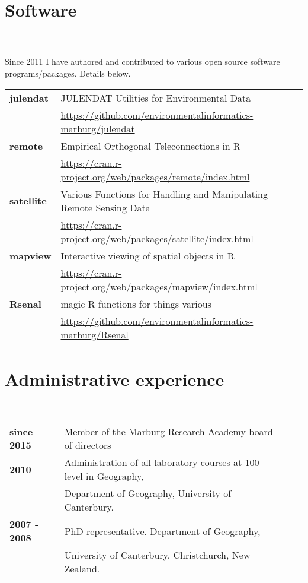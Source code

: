 \documentclass[a4paper,11pt]{article}
\begin{document}
\section{Software}
\hrulefill \\
\hfill \\
Since 2011 I have authored and contributed to various open source software programs/packages. Details below.
\linebreak{}
\linebreak{}
\begin{tabular}{ll}
\textbf{julendat} & JULENDAT Utilities for Environmental Data\\
				  & \url{https://github.com/environmentalinformatics-marburg/julendat}\\
\textbf{remote} 	  & Empirical Orthogonal Teleconnections in R\\
				  & \url{https://cran.r-project.org/web/packages/remote/index.html}\\
\textbf{satellite} & Various Functions for Handling and Manipulating Remote Sensing Data\\
				  & \url{https://cran.r-project.org/web/packages/satellite/index.html}\\
\textbf{mapview} & Interactive viewing of spatial objects in R\\
				  & \url{https://cran.r-project.org/web/packages/mapview/index.html}\\
\textbf{Rsenal}  & magic R functions for things various\\
				 & \url{https://github.com/environmentalinformatics-marburg/Rsenal}\\
\end{tabular}
\linebreak{}

\section{Administrative experience}
\hrulefill \\
\begin{tabular}{llll} \\
\textbf{since 2015} & Member of the Marburg Research Academy board of directors\\
\textbf{2010} & Administration of all laboratory courses at 100 level in Geography,\\
			  & Department of Geography, University of Canterbury.\\
\textbf{2007 - 2008} & PhD representative. Department of Geography,\\
			  & University of Canterbury, Christchurch, New Zealand.
\end{tabular}
\linebreak{}
\pagebreak{}
\end{document}
